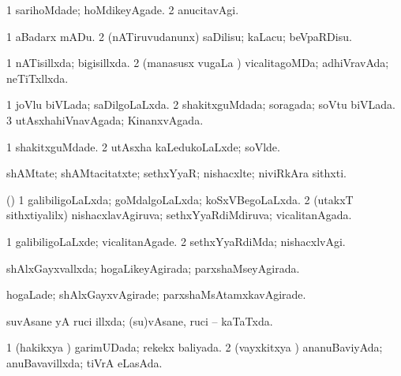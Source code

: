 {\bentry
{} 
\gl{\kirxvi}
\expl{}
\bmng
\bnum
\num{1} sarihoMdade; hoMdikeyAgade. 
\num{2} anucitavAgi. 
\enum
\emng
\eentry

\bentry
{} 
\gl{\sakirx}
\expl{}
\bmng
\bnum
\num{1} aBadarx mADu. 
\num{2} (nATiruvudanunx) saDilisu; kaLacu; beVpaRDisu. 
\enum
\emng
\eentry

\bentry
{} 
\gl{\gu}
\expl{}
\bmng
\bnum
\num{1} nATisillxda; bigisillxda. 
\num{2} (manasusx \mo vugaLa \vi) vicalitagoMDa; adhiVravAda; neTiTxllxda. 
\enum
\emng
\eentry

\bentry
{} 
\gl{\gu}
\expl{}
\bmng
\bnum
\num{1} joVlu biVLada; saDilgoLaLxda. 
\num{2} shakitxguMdada; soragada; soVtu biVLada. 
\num{3} utAsxhahiVnavAgada; KinanxvAgada. 
\enum
\emng
\eentry

\bentry
{} 
\gl{\kirxvi}
\expl{}
\bmng
\bnum
\num{1} shakitxguMdade. 
\num{2} utAsxha kaLedukoLaLxde; soVlde. 
\enum
\emng
\eentry

\bentry
{} 
\gl{\nA}
\expl{}
\bmng
 shAMtate; shAMtacitatxte; sethxYyaR; nishacxlte; niviRkAra sithxti. 
\emng
\eentry

\bentry
{} 
\gl{\gu}
\expl{}
\bmng
(\AmA) 
\bnum
\num{1} galibiligoLaLxda; goMdalgoLaLxda; koSxVBegoLaLxda. 
\num{2} (utakxT sithxtiyalilx) nishacxlavAgiruva; sethxYyaRdiMdiruva; vicalitanAgada. 
\enum
\emng
\eentry

\bentry
{} 
\gl{\kirxvi}
\expl{}
\bmng
\bnum
\num{1} galibiligoLaLxde; vicalitanAgade. 
\num{2} sethxYyaRdiMda; nishacxlvAgi. 
\enum
\emng
\eentry

\bentry
{} 
\gl{\gu}
\expl{}
\bmng
 shAlxGayxvallxda; hogaLikeyAgirada; parxshaMseyAgirada. 
\emng
\eentry

\bentry
{} 
\gl{\kirxvi}
\expl{}
\bmng
 hogaLade; shAlxGayxvAgirade; parxshaMsAtamxkavAgirade. 
\emng
\eentry

\bentry
{} 
\gl{\gu}
\expl{}
\bmng
suvAsane yA ruci illxda; (su)vAsane, ruci -- kaTaTxda. 
\emng
\eentry

\bentry
{} 
\gl{\gu}
\expl{}
\bmng
\bnum
\num{1} (hakikxya \vi) garimUDada; rekekx baliyada. 
\num{2} (vayxkitxya \vi) ananuBaviyAda; anuBavavillxda; tiVrA eLasAda. 
\enum
\emng
\eentry

}

